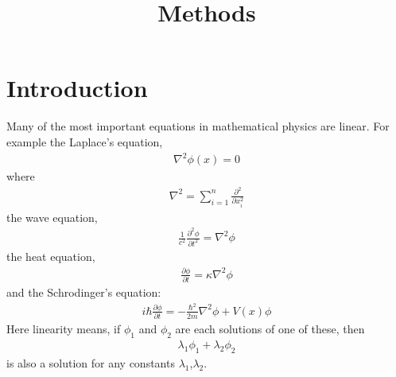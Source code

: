 \documentclass[a4paper]{article}
\begin{document}
\title{Methods}

\maketitle

\newpage

\tableofcontents

\newpage

\section{Introduction}

Many of the most important equations in mathematical physics are linear. For example the Laplace's equation,
\begin{equation*}
\begin{aligned}
\nabla^2 \phi\left(x\right) = 0
\end{aligned}
\end{equation*}
where
\begin{equation*}
\begin{aligned}
\nabla^2 = \sum_{i=1}^n \frac{\partial^2}{\partial x_i^2}
\end{aligned}
\end{equation*}
the wave equation,
\begin{equation*}
\begin{aligned}
\frac{1}{c^2}\frac{\partial^2 \phi}{\partial t^2} = \nabla^2 \phi
\end{aligned}
\end{equation*}
the heat equation,
\begin{equation*}
\begin{aligned}
\frac{\partial \phi}{\partial t} = \kappa \nabla^2 \phi
\end{aligned}
\end{equation*}
and the Schrodinger's equation:
\begin{equation*}
\begin{aligned}
i\hbar\frac{\partial \phi}{\partial t} = -\frac{\hbar^2}{2m} \nabla^2\phi + V\left(x\right) \phi
\end{aligned}
\end{equation*}
Here linearity means, if $\phi_1$ and $\phi_2$ are each solutions of one of these, then
\begin{equation*}
\begin{aligned}
\lambda_1 \phi_1 + \lambda_2 \phi_2
\end{aligned}
\end{equation*}
is also a solution for any constants $\lambda_1$,$\lambda_2$.
\end{document}
